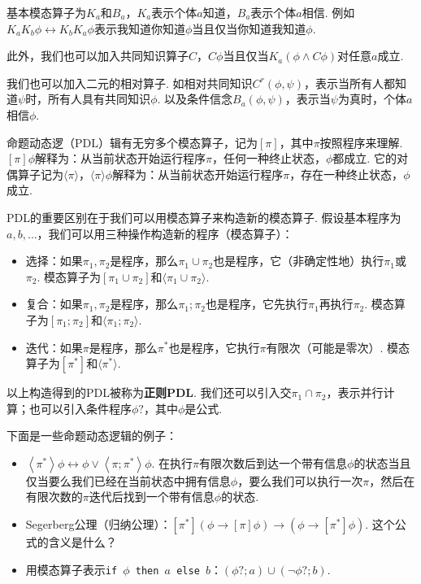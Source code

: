 \begin{example}[认知逻辑]
基本模态算子为$K_a$和$B_a$，$K_a$表示个体$a$知道，$B_a$表示个体$a$相信. 例如$K_aK_b\phi\leftrightarrow K_bK_a\phi$表示我知道你知道$\phi$当且仅当你知道我知道$\phi$.

此外，我们也可以加入共同知识算子$C$，$C \phi$当且仅当$K_a(\phi\wedge C\phi)$对任意$a$成立.

我们也可以加入二元的相对算子. 如相对共同知识$C^r(\phi,\psi)$，表示当所有人都知道$\psi$时，所有人具有共同知识$\phi$. 以及条件信念$B_a(\phi,\psi)$，表示当$\psi$为真时，个体$a$相信$\phi$.
\end{example}

\begin{example}[命题动态逻辑]
命题动态逻（PDL）辑有无穷多个模态算子，记为$[\pi]$，其中$\pi$按照程序来理解. $[\pi]\phi$解释为：从当前状态开始运行程序$\pi$，任何一种终止状态，$\phi$都成立. 它的对偶算子记为$\langle\pi\rangle$，$\langle\pi\rangle\phi$解释为：从当前状态开始运行程序$\pi$，存在一种终止状态，$\phi$成立. 

PDL的重要区别在于我们可以用模态算子来构造新的模态算子. 假设基本程序为$a,b,\dots$，我们可以用三种操作构造新的程序（模态算子）：
\begin{itemize}
    \item 选择：如果$\pi_1,\pi_2$是程序，那么$\pi_1\cup\pi_2$也是程序，它（非确定性地）执行$\pi_1$或$\pi_2$. 模态算子为$[\pi_1\cup\pi_2]$和$\langle\pi_1\cup\pi_2\rangle$.
    \item 复合：如果$\pi_1,\pi_2$是程序，那么$\pi_1;\pi_2$也是程序，它先执行$\pi_1$再执行$\pi_2$. 模态算子为$[\pi_1;\pi_2]$和$\langle\pi_1;\pi_2\rangle$.
    \item 迭代：如果$\pi$是程序，那么$\pi^*$也是程序，它执行$\pi$有限次（可能是零次）. 模态算子为$[\pi^*]$和$\langle\pi^*\rangle$.
\end{itemize}
以上构造得到的PDL被称为\textbf{正则PDL}. 我们还可以引入交$\pi_1\cap\pi_2$，表示并行计算；也可以引入条件程序$\phi?$，其中$\phi$是公式. 

下面是一些命题动态逻辑的例子：
\begin{itemize}
    \item $\left\langle\pi^*\right\rangle \phi \leftrightarrow \phi \vee\left\langle\pi ; \pi^*\right\rangle \phi$. 在执行$\pi$有限次数后到达一个带有信息$\phi$的状态当且仅当要么我们已经在当前状态中拥有信息$\phi$，要么我们可以执行一次$\pi$，然后在有限次数的$\pi$迭代后找到一个带有信息$\phi$的状态. 
    \item Segerberg公理（归纳公理）：$[\pi^*](\phi \to [\pi]\phi) \to (\phi \to [\pi^*]\phi)$. 这个公式的含义是什么？
    \item 用模态算子表示\texttt{if $\phi$ then $a$ else $b$}：$(\phi?;a)\cup(\neg\phi?;b)$. 
\end{itemize}
\end{example}

